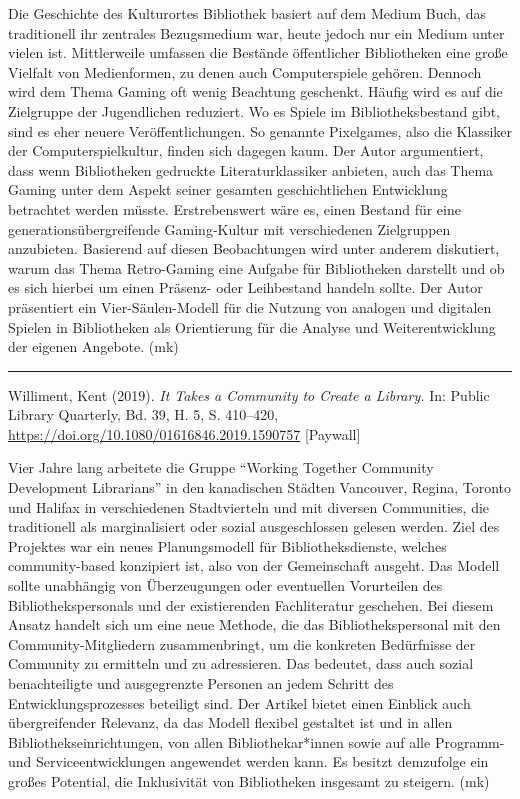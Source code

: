 \documentclass[a4paper,
fontsize=11pt,
oneside,
numbers=noperiodatend,
parskip=half-,
bibliography=totoc,
final
]{scrartcl}
\begin{document}
Die Geschichte des Kulturortes Bibliothek basiert auf dem Medium Buch,
das traditionell ihr zentrales Bezugsmedium war, heute jedoch nur ein
Medium unter vielen ist. Mittlerweile umfassen die Bestände öffentlicher
Bibliotheken eine große Vielfalt von Medienformen, zu denen auch
Computerspiele gehören. Dennoch wird dem Thema Gaming oft wenig
Beachtung geschenkt. Häufig wird es auf die Zielgruppe der Jugendlichen
reduziert. Wo es Spiele im Bibliotheksbestand gibt, sind es eher neuere
Veröffentlichungen. So genannte Pixelgames, also die Klassiker der
Computerspielkultur, finden sich dagegen kaum. Der Autor argumentiert,
dass wenn Bibliotheken gedruckte Literaturklassiker anbieten, auch das
Thema Gaming unter dem Aspekt seiner gesamten geschichtlichen
Entwicklung betrachtet werden müsste. Erstrebenswert wäre es, einen
Bestand für eine generationsübergreifende Gaming-Kultur mit
verschiedenen Zielgruppen anzubieten. Basierend auf diesen Beobachtungen
wird unter anderem diskutiert, warum das Thema Retro-Gaming eine Aufgabe
für Bibliotheken darstellt und ob es sich hierbei um einen Präsenz- oder
Leihbestand handeln sollte. Der Autor präsentiert ein Vier-Säulen-Modell
für die Nutzung von analogen und digitalen Spielen in Bibliotheken als
Orientierung für die Analyse und Weiterentwicklung der eigenen Angebote.
(mk)

\begin{center}\rule{0.5\linewidth}{0.5pt}\end{center}

Williment, Kent (2019). \emph{It Takes a Community to Create a Library.}
In: Public Library Quarterly, Bd. 39, H. 5, S. 410--420,
\url{https://doi.org/10.1080/01616846.2019.1590757} {[}Paywall{]}

Vier Jahre lang arbeitete die Gruppe \enquote{Working Together Community
Development Librarians} in den kanadischen Städten Vancouver, Regina,
Toronto und Halifax in verschiedenen Stadtvierteln und mit diversen
Communities, die traditionell als marginalisiert oder sozial
ausgeschlossen gelesen werden. Ziel des Projektes war ein neues
Planungsmodell für Bibliotheksdienste, welches community-based
konzipiert ist, also von der Gemeinschaft ausgeht. Das Modell sollte
unabhängig von Überzeugungen oder eventuellen Vorurteilen des
Bibliothekspersonals und der existierenden Fachliteratur geschehen. Bei
diesem Ansatz handelt sich um eine neue Methode, die das
Bibliothekspersonal mit den Community-Mitgliedern zusammenbringt, um die
konkreten Bedürfnisse der Community zu ermitteln und zu adressieren. Das
bedeutet, dass auch sozial benachteiligte und ausgegrenzte Personen an
jedem Schritt des Entwicklungsprozesses beteiligt sind. Der Artikel
bietet einen Einblick auch übergreifender Relevanz, da das Modell
flexibel gestaltet ist und in allen Bibliothekseinrichtungen, von allen
Bibliothekar*innen sowie auf alle Programm- und Serviceentwicklungen
angewendet werden kann. Es besitzt demzufolge ein großes Potential, die
Inklusivität von Bibliotheken insgesamt zu steigern. (mk)
\end{document}
